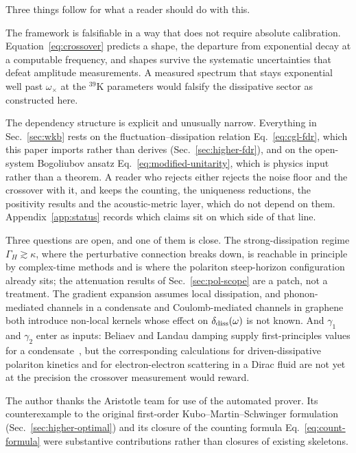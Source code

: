 \documentclass[aps,prd,reprint,nofootinbib,superscriptaddress]{revtex4-2}
\begin{document}
Three things follow for what a reader should do with this.

The framework is falsifiable in a way that does not require absolute
calibration. Equation~\eqref{eq:crossover} predicts a shape, the
departure from exponential decay at a computable frequency, and shapes
survive the systematic uncertainties that defeat amplitude
measurements. A measured spectrum that stays exponential well past
$\omega_\times$ at the $^{39}$K parameters would falsify the dissipative
sector as constructed here.

The dependency structure is explicit and unusually narrow. Everything in
Sec.~\ref{sec:wkb} rests on the fluctuation--dissipation relation
Eq.~\eqref{eq:cgl-fdr}, which this paper imports rather than derives
(Sec.~\ref{sec:higher-fdr}), and on the open-system Bogoliubov ansatz
Eq.~\eqref{eq:modified-unitarity}, which is physics input rather than a
theorem. A reader who rejects either rejects the noise floor and the
crossover with it, and keeps the counting, the uniqueness reductions,
the positivity results and the acoustic-metric layer, which do not
depend on them. Appendix~\ref{app:status} records which claims sit on
which side of that line.

Three questions are open, and one of them is close. The strong-dissipation
regime $\Gamma_H \gtrsim \kappa$, where the perturbative connection
breaks down, is reachable in principle by complex-time methods and is
where the polariton steep-horizon configuration already sits; the
attenuation results of Sec.~\ref{sec:pol-scope} are a patch, not a
treatment. The gradient expansion assumes local dissipation, and
phonon-mediated channels in a condensate and Coulomb-mediated channels
in graphene both introduce non-local kernels whose effect on
$\delta_{\rm diss}(\omega)$ is not known. And $\gamma_1$ and
$\gamma_2$ enter as inputs: Beliaev and Landau damping supply
first-principles values for a condensate~\cite{Zaremba1999}, but the
corresponding calculations for driven-dissipative polariton kinetics and
for electron-electron scattering in a Dirac fluid are not yet at the
precision the crossover measurement would reward.

\begin{acknowledgments}
The author thanks the Aristotle team for use of the automated prover.
Its counterexample to the original first-order
Kubo--Martin--Schwinger formulation (Sec.~\ref{sec:higher-optimal}) and
its closure of the counting formula Eq.~\eqref{eq:count-formula} were
substantive contributions rather than closures of existing skeletons.
\end{acknowledgments}
\end{document}
